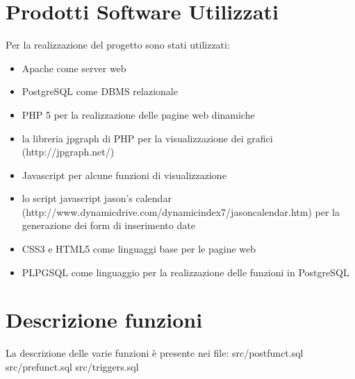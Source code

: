 \documentclass[a4paper,10pt]{article}
\begin{document}
\section{Prodotti Software Utilizzati}
Per la realizzazione del progetto sono stati utilizzati:
\begin{itemize}
\item Apache come server web
\item PostgreSQL come DBMS relazionale
\item PHP 5 per la realizzazione delle pagine web dinamiche
\item la libreria jpgraph di PHP per la visualizzazione dei grafici (http://jpgraph.net/)
\item Javascript per alcune funzioni di visualizzazione
\item lo script javascript jason's calendar (http://www.dynamicdrive.com/dynamicindex7/jasoncalendar.htm) per la generazione dei form di inserimento date
\item CSS3 e HTML5 come linguaggi base per le pagine web
\item PLPGSQL come linguaggio per la realizzazione delle funzioni in PostgreSQL
\end{itemize}

\section{Descrizione funzioni}
La descrizione delle varie funzioni è presente nei file: src/postfunct.sql src/prefunct.sql src/triggers.sql
\end{document}
